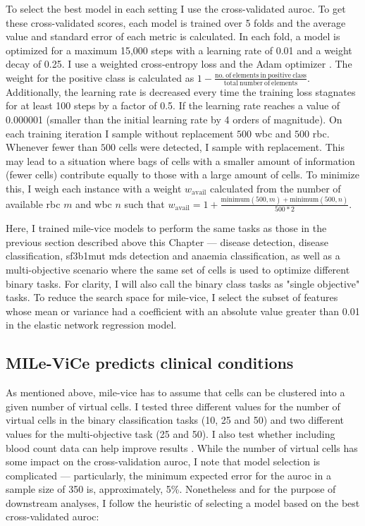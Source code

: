 To select the best model in each setting I use the cross-validated \ac{auroc}. To get these cross-validated scores, each model is trained over 5 folds and the average value and standard error of each metric is calculated. In each fold, a model is optimized for a maximum 15,000 steps with a learning rate of 0.01 and a weight decay of 0.25. I use a weighted cross-entropy loss and the Adam optimizer \cite{Kingma2014-zd}. The weight for the positive class is calculated as $1 - \frac{\mathrm{no.\ of\ elements\ in\ positive\ class}}{\mathrm{total\ number\ of\ elements}}$. Additionally, the learning rate is decreased every time the training loss stagnates for at least 100 steps by a factor of 0.5. If the learning rate reaches a value of 0.000001 (smaller than the initial learning rate by 4 orders of magnitude). On each training iteration I sample without replacement $500$ \ac{wbc} and $500$ \ac{rbc}. Whenever fewer than $500$ cells were detected, I sample with replacement. This may lead to a situation where bags of cells with a smaller amount of information (fewer cells) contribute equally to those with a large amount of cells. To minimize this, I weigh each instance with a weight $w_{\mathrm{avail}}$ calculated from the number of available \ac{rbc} $m$ and \ac{wbc} $n$ such that $w_{\mathrm{avail}} = 1 + \frac{\mathrm{minimum}(500,m) + \mathrm{minimum}(500,n)}{500*2}$.

Here, I trained \ac{mile-vice} models to perform the same tasks as those in the previous section described above this Chapter ---  disease detection, disease classification, \ac{sf3b1}mut \ac{mds} detection and anaemia classification, as well as a multi-objective scenario where the same set of cells is used to optimize different binary tasks. For clarity, I will also call the binary class tasks as "single objective" tasks. To reduce the search space for \ac{mile-vice}, I select the subset of features whose mean or variance had a coefficient with an absolute value greater than 0.01 in the elastic network regression model.

\subsection{MILe-ViCe predicts clinical conditions}

As mentioned above, \ac{mile-vice} has to assume that cells can be clustered into a given number of virtual cells. I tested three different values for the number of virtual cells in the binary classification tasks (10, 25 and 50) and two different values for the multi-objective task (25 and 50). I also test whether including blood count data can help improve results . While the number of virtual cells has some impact on the cross-validation \ac{auroc}, I note that model selection is complicated --- particularly, the minimum expected error for the \ac{auroc} in a sample size of 350 is, approximately, 5\%. Nonetheless and for the purpose of downstream analyses, I follow the heuristic of selecting a model based on the best cross-validated \ac{auroc}:

